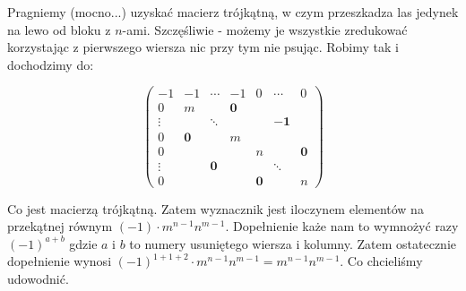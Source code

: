 \documentclass[a4paper,11pt]{article}
\begin{document}
Pragniemy (mocno...) uzyskać macierz trójkątną, w czym przeszkadza las jedynek na lewo od bloku z $n$-ami. Szczęśliwie - możemy je wszystkie zredukować korzystając z pierwszego wiersza nic przy tym nie psując. Robimy tak i dochodzimy do:

\begin{displaymath}
\left(
\begin{array}{c|ccc|ccc}
-1     & -1         & \cdots      & -1         & 0          & \cdots      & 0          \\ \hline
0      & m          &             & \mathbf{0} &            &             &            \\
\vdots &            & \ddots      &            &            & \mathbf{-1} &            \\
0      & \mathbf{0} &             & m          &            &             &            \\ \hline 
0      &            &             &            & n          &             & \mathbf{0} \\
\vdots &            & \mathbf{0} &            &            & \ddots      &            \\
0      &            &             &            & \mathbf{0} &             & n          

\end{array} \right)
\end{displaymath}

Co jest macierzą trójkątną. Zatem wyznacznik jest iloczynem elementów na przekątnej równym $(-1)\cdot m^{n-1}n^{m-1}$. Dopełnienie każe nam to wymnożyć razy $(-1)^{a+b}$ gdzie $a$ i $b$ to numery usuniętego wiersza i kolumny. Zatem ostatecznie dopełnienie wynosi $(-1)^{1 + 1 + 2}\cdot m^{n-1}n^{m-1} = m^{n-1}n^{m-1}$.  Co chcieliśmy udowodnić.
\end{document}
